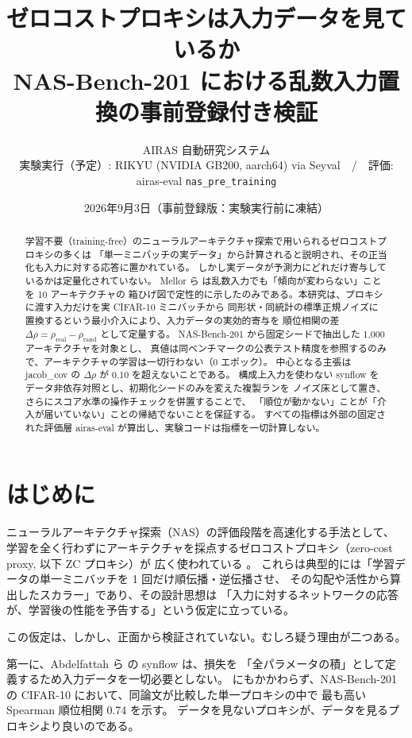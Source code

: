 \documentclass[11pt]{article}
\title{ゼロコストプロキシは入力データを見ているか\\
\large NAS-Bench-201 における乱数入力置換の事前登録付き検証}
\author{AIRAS 自動研究システム\\
\small 実験実行（予定）: RIKYU (NVIDIA GB200, aarch64) via Seyval\ \ /\ \ 評価: airas-eval \texttt{nas\_pre\_training}}
\date{2026年9月3日（事前登録版：実験実行前に凍結）}
\providecommand{\unverified}[1]{#1}
\begin{document}
\maketitle

\begin{abstract}
学習不要（training-free）のニューラルアーキテクチャ探索で用いられるゼロコストプロキシの多くは
「単一ミニバッチの実データ」から計算されると説明され、その正当化も入力に対する応答に置かれている。
しかし実データが予測力にどれだけ寄与しているかは定量化されていない。
Mellor ら \cite{mellor2021naswot} は乱数入力でも「傾向が変わらない」ことを 10 アーキテクチャの
箱ひげ図で定性的に示したのみである。本研究は、プロキシに渡す入力だけを実 CIFAR-10 ミニバッチから
同形状・同統計の標準正規ノイズに置換するという最小介入により、入力データの実効的寄与を
順位相関の差 $\Delta\rho = \rho_{\mathrm{real}} - \rho_{\mathrm{rand}}$ として定量する。
NAS-Bench-201 \cite{dong2020nasbench201} から固定シードで抽出した 1{,}000 アーキテクチャを対象とし、
真値は同ベンチマークの公表テスト精度を参照するのみで、アーキテクチャの学習は一切行わない（0 エポック）。
中心となる主張は jacob\_cov の $\Delta\rho$ が 0.10 を超えないことである。
構成上入力を使わない synflow をデータ非依存対照とし、初期化シードのみを変えた複製ランを
ノイズ床として置き、さらにスコア水準の操作チェックを併置することで、
「順位が動かない」ことが「介入が届いていない」ことの帰結でないことを保証する。
すべての指標は外部の固定された評価層 airas-eval が算出し、実験コードは指標を一切計算しない。
\end{abstract}

\section{はじめに}

ニューラルアーキテクチャ探索（NAS）の評価段階を高速化する手法として、
学習を全く行わずにアーキテクチャを採点するゼロコストプロキシ（zero-cost proxy, 以下 ZC プロキシ）が
広く使われている \cite{abdelfattah2021zerocost,mellor2021naswot}。
これらは典型的には「学習データの単一ミニバッチを 1 回だけ順伝播・逆伝播させ、
その勾配や活性から算出したスカラー」であり、その設計思想は
「入力に対するネットワークの応答が、学習後の性能を予告する」という仮定に立っている。

この仮定は、しかし、正面から検証されていない。むしろ疑う理由が二つある。

第一に、Abdelfattah ら \cite{abdelfattah2021zerocost} の synflow は、損失を
「全パラメータの積」として定義するため入力データを一切必要としない。
にもかかわらず、NAS-Bench-201 の CIFAR-10 において、同論文が比較した単一プロキシの中で
最も高い Spearman 順位相関 \unverified{0.74} を示す。
データを見ないプロキシが、データを見るプロキシより良いのである。
\end{document}
